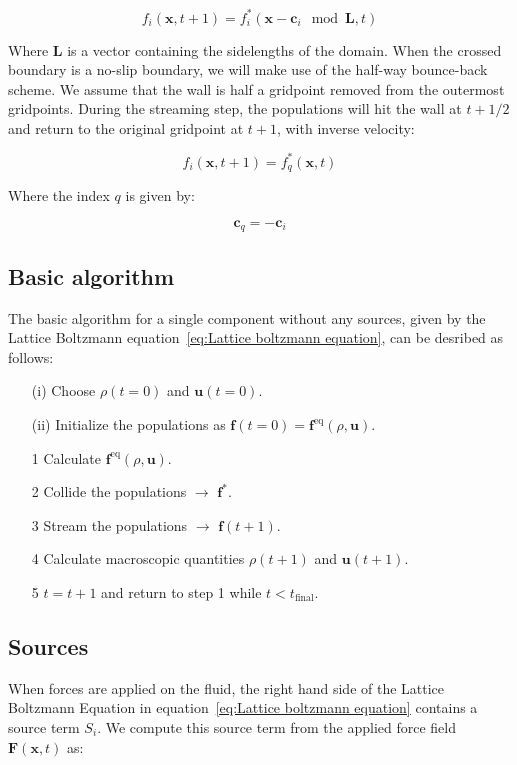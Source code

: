 \begin{equation}\label{eq:Periodic streaming step}
    f_i(\bm{x}, t+1) = f_i^*(\bm{x} - \bm{c}_i \mod \bm{L} , t)
\end{equation}

Where $\bm{L}$ is a vector containing the sidelengths of the domain. When the crossed boundary is a no-slip boundary, we will make use of the half-way bounce-back scheme. We assume that the wall is half a gridpoint removed from the outermost gridpoints. During the streaming step, the populations will hit the wall at $t + 1/2$ and return to the original gridpoint at $t + 1$, with inverse velocity:

\begin{equation}\label{eq:No-slip streaming step}
    f_i(\bm{x}, t+1) = f_q^*(\bm{x}, t)
\end{equation}

Where the index $q$ is given by:

\begin{equation}\label{eq:Bounce-back velocity component}
    \bm{c}_q = -\bm{c}_i
\end{equation}

\subsection{Basic algorithm}\label{subsec:Basic algorithm}
The basic algorithm for a single component without any sources, given by the Lattice Boltzmann equation~\ref{eq:Lattice boltzmann equation}, can be desribed as follows:

\begin{itemize}\label{it:Basic algorithm}
    \item[(i)] Choose $\rho(t=0)$ and $\bm{u}(t=0)$.
    \item[(ii)] Initialize the populations as $\bm{f}(t=0) = \bm{f}^{\text{eq}}(\rho, \bm{u})$. 
    \item[1] Calculate $\bm{f}^{\text{eq}}(\rho, \bm{u})$.
    \item[2] Collide the populations $\rightarrow$ $\bm{f}^*$.
    \item[3] Stream the populations $\rightarrow$ $\bm{f}(t + 1)$.
    \item[4] Calculate macroscopic quantities $\rho(t + 1)$ and $\bm{u}(t + 1)$.
    \item[5] $t = t + 1$ and return to step 1 while $t < t_{\text{final}}$.
\end{itemize}

\subsection{Sources}
When forces are applied on the fluid, the right hand side of the Lattice Boltzmann Equation in equation~\ref{eq:Lattice boltzmann equation} contains a source term $S_i$. We compute this source term from the applied force field $\bm{F}(\bm{x}, t)$ as:

